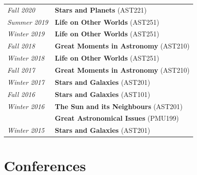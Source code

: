 \documentclass[10pt]{res} %
\begin{document}
\begin{resume}
\begin{table}[h!]
\begin{tabularx}{\textwidth}{lX}
\textit{Fall 2020}      & \textbf{Stars and Planets} (AST221) \\
\textit{Summer 2019} & \textbf{Life on Other Worlds} (AST251) \\
\textit{Winter 2019} & \textbf{Life on Other Worlds} (AST251) \\
\textit{Fall 2018}      & \textbf{Great Moments in Astronomy} (AST210) \\
\textit{Winter 2018} & \textbf{Life on Other Worlds} (AST251) \\
\textit{Fall 2017}      & \textbf{Great Moments in Astronomy} (AST210) \\
\textit{Winter 2017} & \textbf{Stars and Galaxies} (AST201) \\
\textit{Fall 2016} & \textbf{Stars and Galaxies} (AST101) \\
\textit{Winter 2016}  & \textbf{The Sun and its Neighbours} (AST201) \\
                                & \textbf{Great Astronomical Issues} (PMU199) \\
\textit{Winter 2015} & \textbf{Stars and Galaxies} (AST201)
\end{tabularx}
\end{table}


\newpage
\section{\Large Conferences}
\vspace{-5pt} %
\noindent\makebox[\linewidth]{\rule{\textwidth}{0.4pt}}
\vspace{-20pt} %


\end{resume}
\end{document}
